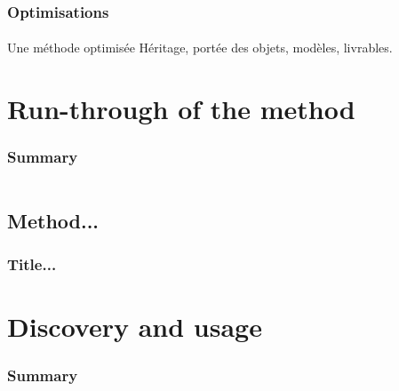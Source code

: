 \documentclass[]{beamer}
\begin{document}
\begin{frame}
    \frametitle{Optimisations}
    \framesubtitle{}
    \begin{block}{Une méthode optimisée}
    Héritage, portée des objets, modèles, livrables.
    \end{block}
\end{frame}




%
%
\section{Run-through of the method}
\begin{frame}
    \frametitle{Summary}
    \begin{columns}[t]
        \begin{column}{5cm}
            \tableofcontents[sections={1-3}, currentsection, hideothersubsections]
        \end{column}
        \begin{column}{5cm}
            \tableofcontents[sections={4-5}, currentsection, hideothersubsections]
        \end{column}
    \end{columns}
\end{frame}
\subsection{Method...}
\begin{frame}
    \frametitle{Title...}
    \framesubtitle{}
\end{frame}




%
%
\section{Discovery and usage}
\begin{frame}
    \frametitle{Summary}
    \begin{columns}[t]
        \begin{column}{5cm}
            \tableofcontents[sections={1-3}, currentsection, hideothersubsections]
        \end{column}
        \begin{column}{5cm}
            \tableofcontents[sections={4-5}, currentsection, hideothersubsections]
        \end{column}
    \end{columns}
\end{frame}
\end{document}
